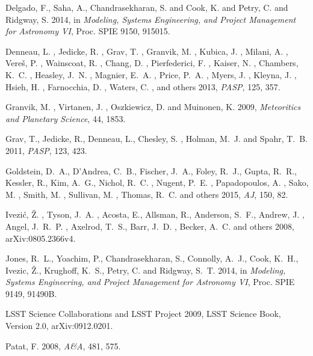 \documentclass{iau}
\begin{document}
\begin{thebibliography}{}

{{Delgado}, F., {Saha}, A., {Chandrasekharan}, S. and {Cook},
  K. and {Petry}, C. and {Ridgway}, S.} 2014,  in \textit{Modeling, Systems Engineering, and Project Management for Astronomy VI}, Proc. SPIE 9150, 915015.

{{Denneau}, L. , {Jedicke}, R. , {Grav}, T. , {Granvik}, M. , 
	{Kubica}, J. , {Milani}, A. , {Vere{\v s}}, P. , {Wainscoat}, R. , 
	{Chang}, D. , {Pierfederici}, F. , {Kaiser}, N. , {Chambers}, K.~C. , 
	{Heasley}, J.~N. , {Magnier}, E.~A. , {Price}, P.~A. , 
	{Myers}, J. , {Kleyna}, J. , {Hsieh}, H. , {Farnocchia}, D. , 
	{Waters}, C. , and others} 2013, \textit{PASP},
      125, 357.

{{Granvik}, M. ,  {Virtanen}, J. , {Oszkiewicz}, D. and {Muinonen},
  K.} 2009, \textit{Meteoritics and Planetary Science}, 44, 1853.

 {{Grav}, T., {Jedicke}, R., {Denneau}, L., {Chesley}, S. ,
	{Holman}, M.~J. and {Spahr}, T.~B.} 2011, \textit{PASP}, 123, 423.

{{Goldstein}, D.~A., {D'Andrea}, C.~B., {Fischer}, J.~A., 
	{Foley}, R.~J., {Gupta}, R.~R., {Kessler}, R., {Kim}, A.~G., 
	{Nichol}, R.~C. , {Nugent}, P.~E. , {Papadopoulos}, A. , 
	{Sako}, M. , {Smith}, M. , {Sullivan}, M. , {Thomas},
        R.~C. and others} 2015, \textit{AJ}, 150, 82.

{Ivezi\'c, \v{Z}. ,  Tyson, J.~A. , Acosta, E., Allsman, R., 
  Anderson, S.~F., Andrew, J. , Angel, J.~R.~P. , Axelrod,
  T.~S., Barr, J.~D. , Becker, A.~C. and others} 2008,
arXiv:0805.2366v4.

{{Jones}, R.~L., {Yoachim}, P., {Chandrasekharan}, S., {Connolly},
  A.~J., {Cook}, K.~H., {Ivezic}, {\v Z}., {Krughoff}, K.~S., {Petry},
  C. and {Ridgway}, S.~T.} 2014, in \textit{Modeling, Systems Engineering, and Project Management for Astronomy VI}, Proc. SPIE 9149, 91490B.

{LSST Science Collaborations and LSST Project} 2009, LSST Science Book,
Version 2.0, arXiv:0912.0201.

{Patat, F.} 2008, \textit{A\&A}, 481, 575.

\end{thebibliography}

\end{document}

